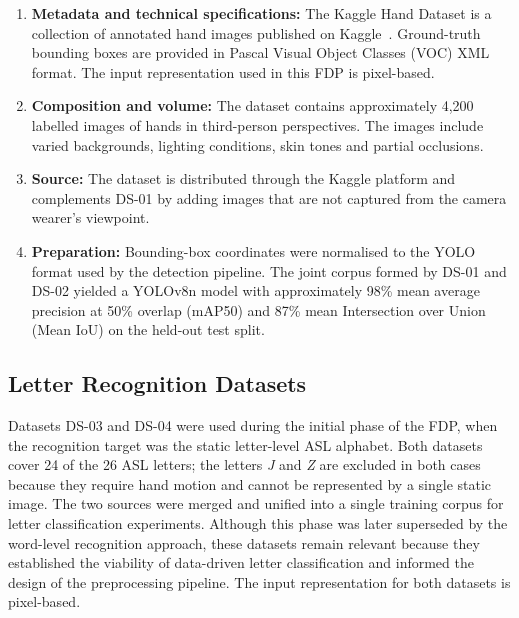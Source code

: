 \begin{enumerate}
    \item \textbf{Metadata and technical specifications:} The Kaggle Hand Dataset is a collection of annotated hand images published on
          Kaggle~\cite{kagglehands2023}. Ground-truth bounding boxes are provided in Pascal Visual Object
          Classes (VOC) XML format. The input representation used in this FDP is pixel-based.

    \item \textbf{Composition and volume:} The dataset contains approximately 4,200 labelled images of hands in third-person perspectives. The
          images include varied backgrounds, lighting conditions, skin tones and partial occlusions.

    \item \textbf{Source:} The dataset is distributed through the Kaggle platform and complements DS-01 by adding images that
          are not captured from the camera wearer's viewpoint.

    \item \textbf{Preparation:} Bounding-box coordinates were normalised to the YOLO format used by the detection pipeline. The
          joint corpus formed by DS-01 and DS-02 yielded a YOLOv8n model with approximately 98\% mean average
          precision at 50\% overlap (mAP50) and 87\% mean Intersection over Union (Mean IoU) on the held-out
          test split.

\end{enumerate}

\subsection{Letter Recognition Datasets}
\label{subsec:datasets_lr}

Datasets DS-03 and DS-04 were used during the initial phase of the FDP, when the recognition target
was the static letter-level ASL alphabet. Both datasets cover 24 of the 26 ASL letters; the letters
\textit{J} and \textit{Z} are excluded in both cases because they require hand motion and cannot be
represented by a single static image. The two sources were merged and unified into a single
training corpus for letter classification experiments. Although this phase was later superseded by
the word-level recognition approach, these datasets remain relevant because they established the
viability of data-driven letter classification and informed the design of the preprocessing
pipeline. The input representation for both datasets is pixel-based.

